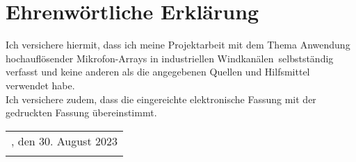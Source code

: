 \chapter*{Ehrenwörtliche Erklärung}
\thispagestyle{empty}

\vspace{5cm}
Ich versichere hiermit, dass ich meine Projektarbeit mit dem Thema \glqq Anwendung hochauflösender Mikrofon-Arrays in industriellen Windkanälen\grqq\ selbstständig verfasst und keine anderen als die angegebenen Quellen und Hilfsmittel verwendet habe. \\
Ich versichere zudem, dass die eingereichte elektronische Fassung mit der gedruckten Fassung übereinstimmt.

\vfill
\begin{tabular}{l}
	\hline
	\standort, den 30. August 2023\\
	\autor
\end{tabular}

